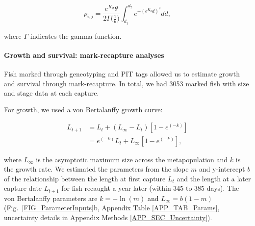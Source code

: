 \documentclass[12pt, oneside]{article}   	%
\begin{document}
\begin{equation} %
p_{i,j} = \frac{e^{K_d}\theta}{2\Gamma({\frac{1}{\theta})}} \int_{d_1}^{d_2}e^{-(e^{K_d}d)^\theta}  dd, \label{EQN_integratingDK}
\end{equation}

where $\Gamma$ indicates the gamma function.

\paragraph*{Growth and survival: mark-recapture analyses}

Fish marked through geneotyping and PIT tags allowed us to estimate growth and survival through mark-recapture. In total, we had 3053 marked fish with size and stage data at each capture. 

For growth, we used a von Bertalanffy growth curve:

\begin{equation} \label{EQN_VBL} 
\begin{split}
L_{t+1} & = L_t + (L_\infty - L_t)[1 - e^{(-k)}] \\
 & = e^{(-k)}L_t + L_\infty[1 - e^{(-k)}],
\end{split}
\end{equation}

where $L_\infty$ is the asymptotic maximum size across the metapopulation and $k$ is the growth rate. We estimated the parameters from the slope $m$ and y-intercept $b$ of the relationship between the length at first capture $L_t$ and the length at a later capture date $L_{t+1}$ for fish recaught a year later (within 345 to 385 days). The von Bertalanffy parameters are $k = -\ln(m)$ and $L_\infty = b(1-m)$ \citep{hart2009estimating} (Fig.\ \ref{FIG_ParameterInputs}b, Appendix Table \ref{APP_TAB_Params}, uncertainty details in Appendix Methods \ref{APP_SEC_Uncertainty}).
\end{document}
